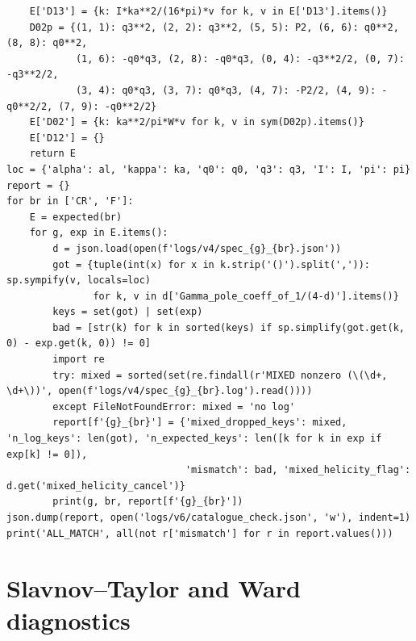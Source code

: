 \documentclass[10pt]{article}
\begin{document}
\begin{lstlisting}
    E['D13'] = {k: I*ka**2/(16*pi)*v for k, v in E['D13'].items()}
    D02p = {(1, 1): q3**2, (2, 2): q3**2, (5, 5): P2, (6, 6): q0**2, (8, 8): q0**2,
            (1, 6): -q0*q3, (2, 8): -q0*q3, (0, 4): -q3**2/2, (0, 7): -q3**2/2,
            (3, 4): q0*q3, (3, 7): q0*q3, (4, 7): -P2/2, (4, 9): -q0**2/2, (7, 9): -q0**2/2}
    E['D02'] = {k: ka**2/pi*W*v for k, v in sym(D02p).items()}
    E['D12'] = {}
    return E
loc = {'alpha': al, 'kappa': ka, 'q0': q0, 'q3': q3, 'I': I, 'pi': pi}
report = {}
for br in ['CR', 'F']:
    E = expected(br)
    for g, exp in E.items():
        d = json.load(open(f'logs/v4/spec_{g}_{br}.json'))
        got = {tuple(int(x) for x in k.strip('()').split(',')): sp.sympify(v, locals=loc)
               for k, v in d['Gamma_pole_coeff_of_1/(4-d)'].items()}
        keys = set(got) | set(exp)
        bad = [str(k) for k in sorted(keys) if sp.simplify(got.get(k, 0) - exp.get(k, 0)) != 0]
        import re
        try: mixed = sorted(set(re.findall(r'MIXED nonzero (\(\d+, \d+\))', open(f'logs/v4/spec_{g}_{br}.log').read())))
        except FileNotFoundError: mixed = 'no log'
        report[f'{g}_{br}'] = {'mixed_dropped_keys': mixed, 'n_log_keys': len(got), 'n_expected_keys': len([k for k in exp if exp[k] != 0]),
                               'mismatch': bad, 'mixed_helicity_flag': d.get('mixed_helicity_cancel')}
        print(g, br, report[f'{g}_{br}'])
json.dump(report, open('logs/v6/catalogue_check.json', 'w'), indent=1)
print('ALL_MATCH', all(not r['mismatch'] for r in report.values()))
\end{lstlisting}
\section{Slavnov--Taylor and Ward diagnostics}
\end{document}
